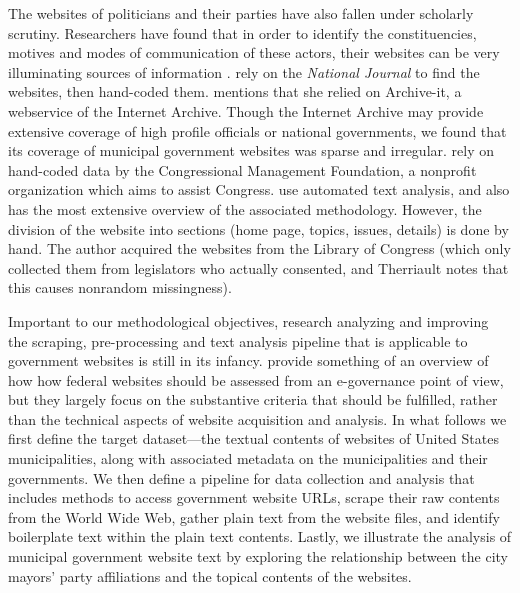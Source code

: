 \documentclass[11pt]{article}
\begin{document}
The websites of politicians and their parties have also fallen under scholarly scrutiny. Researchers have found that in order to identify the constituencies, motives and modes of communication of these actors, their websites can be very illuminating sources of information \citep{Druckman2009,Druckman2010,Cryer2017,Esterling2011,Esterling2011a,Norris2003,Therriault2010}. \cite{Druckman2009,Druckman2010} rely on the \textit{National Journal} to find the websites, then hand-coded them. \cite{Cryer2017} mentions that she relied on Archive-it, a webservice of the Internet Archive. Though the Internet Archive may provide extensive coverage of high profile officials or national governments, we found that its coverage of municipal government websites was sparse and irregular.
\cite{Esterling2011,Esterling2011a} rely on hand-coded data by the Congressional Management Foundation, a nonprofit organization which aims to assist Congress. \cite{Therriault2010} use automated text analysis, and also has the most extensive overview of the associated methodology. However, the division of the website into sections (home page, topics, issues, details) is done by hand. The author acquired the websites from the Library of Congress (which only collected them from legislators who actually consented, and Therriault notes that this causes nonrandom missingness).

Important to our methodological objectives, research analyzing and improving the scraping, pre-processing and text analysis pipeline that is applicable to government websites is still in its infancy. \cite{Eschenfelder2002} provide something of an overview of how how federal websites should be assessed from an e-governance point of view, but they largely focus on the substantive criteria that should be fulfilled, rather than the technical aspects of website acquisition and analysis. In what follows we first define the target dataset---the textual contents of websites of United States municipalities, along with associated metadata on the municipalities and their governments. We then define a pipeline for data collection and analysis that includes methods to access government website URLs, scrape their raw contents from the World Wide Web, gather plain text from the website files, and identify boilerplate text within the plain text contents. Lastly, we illustrate the analysis of municipal government website text by exploring the relationship between the city mayors' party affiliations and the topical contents of the websites.
\end{document}
